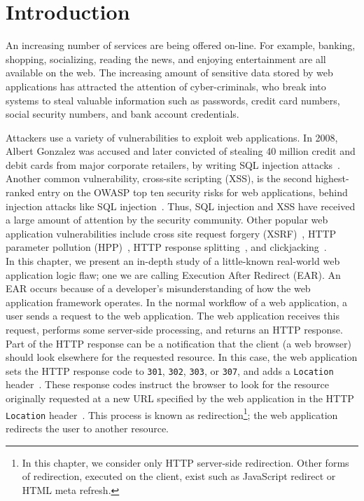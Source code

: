 



\section{Introduction}
An increasing number of services are being offered on-line. For
example, banking, shopping, socializing, reading the news, and
enjoying entertainment are all available on the web. The increasing amount
of sensitive data stored by web applications has
attracted the attention of cyber-criminals, who break into systems to
steal valuable information such as passwords, credit card numbers,
social security numbers, and bank account credentials.

Attackers use a variety of vulnerabilities to exploit web applications. In
2008, Albert Gonzalez was accused and later convicted of stealing 40
million credit and debit cards from major corporate retailers, by writing
SQL injection attacks~\cite{gonzalez08:indictment,ortiz10:outcome}. Another
common vulnerability, cross-site scripting (XSS), is the second
highest-ranked entry on the OWASP top ten security risks for web
applications, behind injection attacks like SQL
injection~\cite{owasptopten}. Thus, SQL injection and XSS have received a
large amount of attention by the security community. Other popular web
application vulnerabilities include cross site request forgery
(XSRF)~\cite{barth08:csrf}, HTTP parameter pollution
(HPP)~\cite{carettoni09:hpp,balduzzi11:hpp}, HTTP response
splitting~\cite{klein04:http-response-splitting}, and
clickjacking~\cite{hansen08:clickjacking,balduzzi10:clickjacking}. 
\\

\noindent{}In this chapter, we present an in-depth study of a little-known
real-world web application logic flaw; one we are calling Execution
After Redirect (EAR). An EAR occurs because of a developer's
misunderstanding of how the web application framework operates. In the
normal workflow of a web application, a user sends a request to the web
application. The web application receives this request, performs some
server-side processing, and returns an HTTP response. Part of the HTTP
response can be a notification that the client (a web browser) should look
elsewhere for the requested resource. In this case, the web application
sets the HTTP response code to \texttt{301}, \texttt{302},
\texttt{303}, or \texttt{307}, and adds a \texttt{Location}
header~\cite{fielding99:http11statuscode}. These response codes instruct
the browser to look for the resource originally requested at a new URL
specified by the web application in the HTTP \texttt{Location}
header~\cite{fielding99:http11location}. This process is known as
redirection\footnote{In this chapter, we consider only HTTP server-side
  redirection. Other forms of redirection, executed on the client, exist
  such as JavaScript redirect or HTML meta refresh.}; the web application
redirects the user to another resource.

